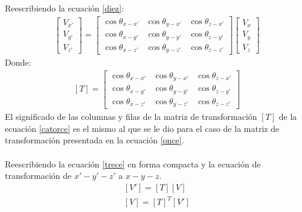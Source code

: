 \documentclass[12pt,letterpaper]{article}
\begin{document}
%
Reescribiendo la ecuación \ref{diez}:
%
\begin{eqnarray}
		\left[ \begin{array}{c} V_{x'} \\
		V_{y'} \\ V_{z'} \end{array} \right] = 
		\left[ \begin{array}{ccc}
		\cos \theta_{x-x'} & \cos \theta_{y-x'} & \cos \theta_{z-x'} \\  
		\cos \theta_{x-y'} & \cos \theta_{y-y'} & \cos \theta_{z-y'} \\
		\cos \theta_{x-z'} & \cos \theta_{y-z'} & \cos \theta_{z-z'}
		\end{array}  \right] 
		\left[ \begin{array}{c} V_{x} \\
		V_{y} \\ V_{z} \end{array} \right]
		\label{trece}
\end{eqnarray}
%
Donde:
%
\begin{align}
	\left[ T \right] = \left[ \begin{array}{ccc}
		\cos \theta_{x-x'} & \cos \theta_{y-x'} & \cos \theta_{z-x'} \\  
		\cos \theta_{x-y'} & \cos \theta_{y-y'} & \cos \theta_{z-y'} \\
		\cos \theta_{x-z'} & \cos \theta_{y-z'} & \cos \theta_{z-z'}
		\end{array}  \right] \label{catorce}
\end{align}
%
El significado de las columnas y filas de la matriz de transformación $\left[ T \right]$ de la ecuación \ref{catorce} es el mismo al que se le dio para el caso de la matriz de transformación presentada en la ecuación \ref{once}.\\\\
%
Reescribiendo la ecuación \ref{trece} en forma compacta y la ecuación de transformación de $x'-y'-z'$ a $x-y-z$.
%
\begin{align*}
	\left[ V' \right] = \left[ T \right] \left[ V \right] \\
	\left[ V \right] = \left[ T \right]^T \left[ V' \right]
\end{align*}
%
%
\end{document}
